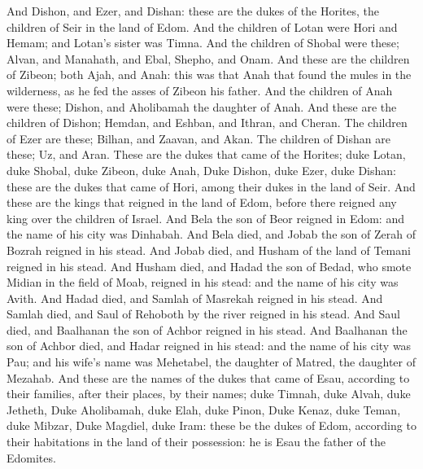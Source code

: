 \begin{biblechapter}
\verse And Dishon, and Ezer, and Dishan: these are the dukes of the Horites, the children of Seir in the land of Edom.
\verse And the children of Lotan were Hori and Hemam; and Lotan's sister was Timna.
\verse And the children of Shobal were these; Alvan, and Manahath, and Ebal, Shepho, and Onam.
\verse And these are the children of Zibeon; both Ajah, and Anah: this was that Anah that found the mules in the wilderness, as he fed the asses of Zibeon his father.
\verse And the children of Anah were these; Dishon, and Aholibamah the daughter of Anah.
\verse And these are the children of Dishon; Hemdan, and Eshban, and Ithran, and Cheran.
\verse The children of Ezer are these; Bilhan, and Zaavan, and Akan.
\verse The children of Dishan are these; Uz, and Aran.
\verse These are the dukes that came of the Horites; duke Lotan, duke Shobal, duke Zibeon, duke Anah,
\verse Duke Dishon, duke Ezer, duke Dishan: these are the dukes that came of Hori, among their dukes in the land of Seir.
 And these are the kings that reigned in the land of Edom, before there reigned any king over the children of Israel.
\verse And Bela the son of Beor reigned in Edom: and the name of his city was Dinhabah.
\verse And Bela died, and Jobab the son of Zerah of Bozrah reigned in his stead.
\verse And Jobab died, and Husham of the land of Temani reigned in his stead.
\verse And Husham died, and Hadad the son of Bedad, who smote Midian in the field of Moab, reigned in his stead: and the name of his city was Avith.
\verse And Hadad died, and Samlah of Masrekah reigned in his stead.
\verse And Samlah died, and Saul of Rehoboth by the river reigned in his stead.
\verse And Saul died, and Baalhanan the son of Achbor reigned in his stead.
\verse And Baalhanan the son of Achbor died, and Hadar reigned in his stead: and the name of his city was Pau; and his wife's name was Mehetabel, the daughter of Matred, the daughter of Mezahab.
\verse And these are the names of the dukes that came of Esau, according to their families, after their places, by their names; duke Timnah, duke Alvah, duke Jetheth,
\verse Duke Aholibamah, duke Elah, duke Pinon,
\verse Duke Kenaz, duke Teman, duke Mibzar,
\verse Duke Magdiel, duke Iram: these be the dukes of Edom, according to their habitations in the land of their possession: he is Esau the father of the Edomites.
\end{biblechapter}

